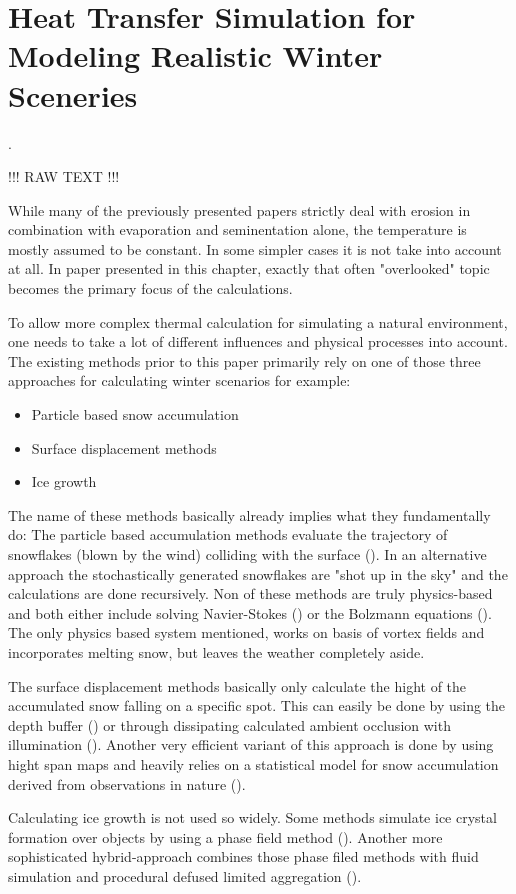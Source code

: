 \section{Heat Transfer Simulation for Modeling Realistic Winter Sceneries}

\cite{benes2001layered}.

!!! RAW TEXT !!!

While many of the previously presented papers strictly deal with erosion in combination with evaporation and seminentation alone, the temperature is mostly assumed to be constant. In some simpler cases it is not take into account at all. In paper presented in this chapter, exactly that often "overlooked" topic becomes the primary focus of the calculations.

To allow more complex thermal calculation for simulating a natural environment, one needs to take a lot of different influences and physical processes into account. The existing methods prior to this paper primarily rely on one of those three approaches for calculating winter scenarios for example:
\begin{itemize}
	\item Particle based snow accumulation
	\item Surface displacement methods
	\item Ice growth
\end{itemize}

The name of these methods basically already implies what they fundamentally do:
The particle based accumulation methods evaluate the trajectory of snowflakes (blown by the wind) colliding with the surface (). In an alternative approach the stochastically generated snowflakes are "shot up in the sky" and the calculations are done recursively. Non of these methods are truly physics-based and both either include solving Navier-Stokes () or the Bolzmann equations (). The only physics based system mentioned, works on basis of vortex fields and incorporates melting snow, but leaves the weather completely aside.

The surface displacement methods basically only calculate the hight of the accumulated snow falling on a specific spot. This can easily be done by using the depth buffer () or through dissipating calculated ambient occlusion with illumination (). Another very efficient variant of this approach is done by using hight span maps and heavily relies on a statistical model for snow accumulation derived from observations in nature ().

Calculating ice growth is not used so widely. Some methods simulate ice crystal formation over objects by using a phase field method (). Another more sophisticated hybrid-approach combines those phase filed methods with fluid simulation and procedural defused limited aggregation ().

